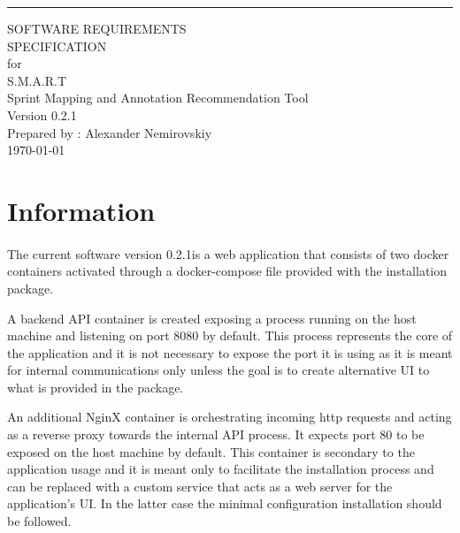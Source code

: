 \documentclass{scrreprt}
\date{}
\begin{document}
	
\newcommand{\version}[0]{0.2.1}
\newcommand{\proxy}[0]{\texttt{proxy.conf}}
\newcommand{\jaxb}[0]{\texttt{jaxb_impl-0.1.3.jar}}
\newcommand{\model}[0]{\texttt{model.bin}}

\begin{flushright}
	\rule{16cm}{5pt}\vskip1cm
	\begin{bfseries}
		\Huge{SOFTWARE REQUIREMENTS\\ SPECIFICATION}\\
		\vspace{1.5cm}
		for\\
		\vspace{1.5cm}
		S.M.A.R.T\\
		\large{Sprint Mapping and Annotation Recommendation Tool\\}
		\vspace{1.5cm}
		\LARGE{Version \version}\\
		\vspace{5cm}
		Prepared by : Alexander Nemirovskiy\\
		\today\\
	\end{bfseries}
\end{flushright}

\pagebreak
\section[1]{Information}
\paragraph{}The current software version \version \space is a web application that consists of two docker containers activated through a docker-compose file provided with the installation package. 

A backend API container is created exposing a process running on the host machine and listening on port 8080 by default. This process represents the core of the application and it is not necessary to expose the port it is using as it is meant for internal communications only unless the goal is to create alternative UI to what is provided in the package.

An additional NginX container is orchestrating incoming http requests and acting as a reverse proxy towards the internal API process. It expects port 80 to be exposed on the host machine by default. This container is secondary to the application usage and it is meant only to facilitate the installation process and can be replaced with a custom service that acts as a web server for the application's UI. In the latter case the minimal configuration installation should be followed.
\end{document}
